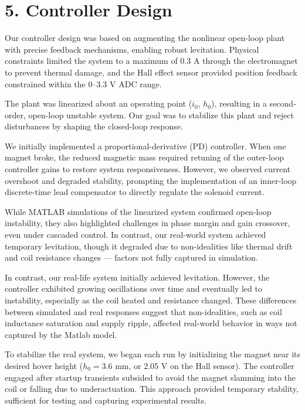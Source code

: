 \documentclass[12pt]{article}
\begin{document}
\section*{5. Controller Design}

Our controller design was based on augmenting the nonlinear open-loop plant with precise feedback mechanisms, enabling robust levitation. Physical constraints limited the system to a maximum of 0.3 A through the electromagnet to prevent thermal damage, and the Hall effect sensor provided position feedback constrained within the 0–3.3 V ADC range.

The plant was linearized about an operating point ($i_0$, $h_0$), resulting in a second-order, open-loop unstable system. Our goal was to stabilize this plant and reject disturbances by shaping the closed-loop response.

We initially implemented a proportional-derivative (PD) controller. When one magnet broke, the reduced magnetic mass required retuning of the outer-loop controller gains to restore system responsiveness. However, we observed current overshoot and degraded stability, prompting the implementation of an inner-loop discrete-time lead compensator to directly regulate the solenoid current.

While MATLAB simulations of the linearized system confirmed open-loop instability, they also highlighted challenges in phase margin and gain crossover, even under cascaded control. In contrast, our real-world system achieved temporary levitation, though it degraded due to non-idealities like thermal drift and coil resistance changes — factors not fully captured in simulation.

In contrast, our real-life system initially achieved levitation. However, the controller exhibited growing oscillations over time and eventually led to instability, especially as the coil heated and resistance changed. These differences between simulated and real responses suggest that non-idealities, such as coil inductance saturation and supply ripple, affected real-world behavior in ways not captured by the Matlab model.

To stabilize the real system, we began each run by initializing the magnet near its desired hover height ($h_0 = 3.6$ mm, or 2.05 V on the Hall sensor). The controller engaged after startup transients subsided to avoid the magnet slamming into the coil or falling due to underactuation. This approach provided temporary stability, sufficient for testing and capturing experimental results.
\end{document}
